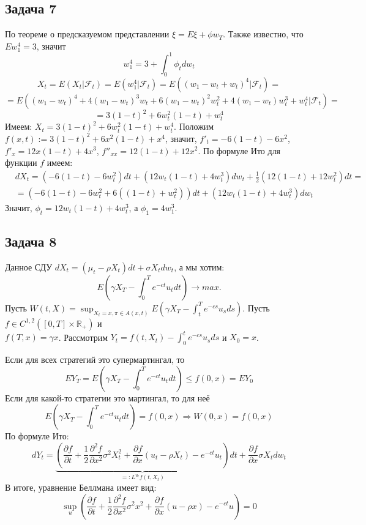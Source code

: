 \documentclass[12pt]{article}
\newcommand\cF{{\mathcal F}}
\begin{document}
\subsection{Задача 7}
По теореме о предсказуемом представлении $\xi = E\xi + \phi w_T$. Также известно, что $Ew_1^4 = 3$, значит
\[w_1^4 = 3 + \int _0^1 \phi_t d w_t\]
\[X_t = E(X_t | \cF_t) = E(w_1^4 |\cF_t ) = E((w_1 - w_t + w_t)^4 |\cF_t ) = \]
\[ =E((w_1 - w_t)^4 + 4(w_1 - w_t)^3 w_t + 6(w_1 - w_t)^2 w_t^2 + 4(w_1 - w_t)w_t^3 + w_t^4 | \cF_t) = \]
\[= 3(1-t)^2 + 6w_t^2 (1-t) + w_t^4\]
Имеем: $X_t=3(1-t)^2+6w_t^2(1-t)+w_t^4$.
\newline
Положим $f(x,t):=3(1-t)^2+6x^2(1-t)+x^4$, значит, $f'_t=-6(1-t)-6x^2$, $f'_x=12x(1-t)+4x^3$, $f''_{xx}=12(1-t)+12x^2$.
\newline
По формуле Ито для функции $f$ имеем:
\begin{equation*}
\begin{split}
&dX_t=(-6(1-t)-6w_t^2)dt+(12w_t(1-t)+4w_t^3)dw_t+\frac 12(12(1-t)+12w_t^2)dt=\\
&=(-6(1-t)-6w_t^2+6((1-t)+w_t^2))dt+(12w_t(1-t)+4w_t^3)dw_t
\end{split}
\end{equation*}
Значит, $\phi_t=12w_t(1-t)+4w_t^3$, а $\phi_1=4w_1^3$.

\subsection{Задача 8}
Данное СДУ $dX_t=(\mu_t-\rho X_t)dt+\sigma X_tdw_t$, а мы хотим:
$$E(\gamma X_T -\int_0^T e^{-ct}u_tdt)\to max.$$
Пусть $W(t,X)=\sup_{X_t=x, \pi\in A(x,t)} E(\gamma X_T -\int_t^T e^{-cs}u_s ds)$. Пусть $f\in C^{1,2} ([0,T]\times\mathbb{R_+})$ и\\ $f(T,x)=\gamma x$. Рассмотрим $Y_t=f(t, X_t)-\int_0^t e^{-cs}u_s ds$ и $X_0=x$.

Если для всех стратегий это супермартингал, то
$$EY_T=E(\gamma X_T-\int_0^T e^{-ct}u_t dt)\le f(0,x)=EY_0$$
Если для какой-то стратегии это мартингал, то для неё
$$E(\gamma X_T-\int_0^T e^{-ct}u_t dt)=f(0,x) \Rightarrow W(0,x)=f(0,x)$$
По формуле Ито:
$$dY_t=\underbrace{\left( \frac{\partial f}{\partial t}+\frac 12 \frac{\partial^2 f}{\partial x^2} \sigma^2 X_t^2 +\frac{\partial f}{\partial x}(u_t-\rho X_t) -e^{-ct} u_t\right)}_{=:L^{u_t}f(t,X_t)}dt +\frac{\partial f}{\partial x}\sigma X_tdw_t$$
В итоге, уравнение Беллмана имеет вид:
$$\sup_u\left(\frac{\partial f}{\partial t}+\frac 12 \frac{\partial^2 f}{\partial x^2} \sigma^2 x^2 +\frac{\partial f}{\partial x}(u-\rho x) -e^{-ct} u\right)=0$$
\end{document}

